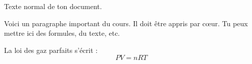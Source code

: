 \documentclass[a4paper,12pt]{article}
\begin{document}
	
	Texte normal de ton document.
	
	\begin{tcolorbox}[apprentissage]
		Voici un paragraphe important du cours.  
		Il doit être appris par cœur.  
		Tu peux mettre ici des formules, du texte, etc.
	\end{tcolorbox}
	
	\lipsum[2] %
	
	\begin{tcolorbox}[apprentissage,title=Formule clé]
		La loi des gaz parfaits s'écrit : 
		\[
		PV = nRT
		\]
	\end{tcolorbox}
	
\end{document}
